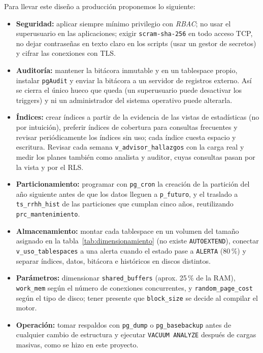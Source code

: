 \documentclass[12pt,a4paper]{article}
\begin{document}
Para llevar este diseño a producción proponemos lo siguiente:

\begin{itemize}
    \item \textbf{Seguridad:} aplicar siempre mínimo privilegio con \textit{RBAC}; no usar el superusuario en las aplicaciones; exigir \texttt{scram-sha-256} en todo acceso TCP, no dejar contraseñas en texto claro en los scripts (usar un gestor de secretos) y cifrar las conexiones con TLS.
    \item \textbf{Auditoría:} mantener la bitácora inmutable y en un tablespace propio, instalar \texttt{pgAudit} y enviar la bitácora a un servidor de registros externo. Así se cierra el único hueco que queda (un superusuario puede desactivar los triggers) y ni un administrador del sistema operativo puede alterarla.
    \item \textbf{Índices:} crear índices a partir de la evidencia de las vistas de estadísticas (no por intuición), preferir índices de cobertura para consultas frecuentes y revisar periódicamente los índices sin uso; cada índice cuesta espacio y escritura. Revisar cada semana \texttt{v\_\allowbreak{}advisor\_\allowbreak{}hallazgos} con la carga real y medir los planes también como analista y auditor, cuyas consultas pasan por la vista y por el RLS.
    \item \textbf{Particionamiento:} programar con \texttt{pg\_\allowbreak{}cron} la creación de la partición del año siguiente antes de que los datos lleguen a \texttt{p\_\allowbreak{}futuro}, y el traslado a \texttt{ts\_\allowbreak{}rrhh\_\allowbreak{}hist} de las particiones que cumplan cinco años, reutilizando \texttt{prc\_\allowbreak{}mantenimiento}.
    \item \textbf{Almacenamiento:} montar cada tablespace en un volumen del tamaño asignado en la tabla~\ref{tab:dimensionamiento} (no existe \texttt{AUTOEXTEND}), conectar \texttt{v\_\allowbreak{}uso\_\allowbreak{}tablespaces} a una alerta cuando el estado pase a \texttt{ALERTA} (80\,\%) y separar índices, datos, bitácora e históricos en discos distintos.
    \item \textbf{Parámetros:} dimensionar \texttt{shared\_\allowbreak{}buffers} (aprox. 25\,\% de la RAM), \texttt{work\_\allowbreak{}mem} según el número de conexiones concurrentes, y \texttt{random\_\allowbreak{}page\_\allowbreak{}cost} según el tipo de disco; tener presente que \texttt{block\_\allowbreak{}size} se decide al compilar el motor.
    \item \textbf{Operación:} tomar respaldos con \texttt{pg\_\allowbreak{}dump} o \texttt{pg\_\allowbreak{}basebackup} antes de cualquier cambio de estructura y ejecutar \texttt{VACUUM ANALYZE} después de cargas masivas, como se hizo en este proyecto.
\end{itemize}
\end{document}
